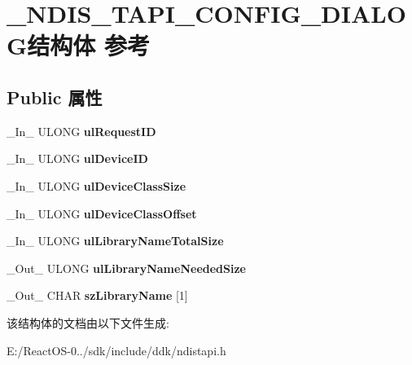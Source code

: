 \hypertarget{struct___n_d_i_s___t_a_p_i___c_o_n_f_i_g___d_i_a_l_o_g}{}\section{\+\_\+\+N\+D\+I\+S\+\_\+\+T\+A\+P\+I\+\_\+\+C\+O\+N\+F\+I\+G\+\_\+\+D\+I\+A\+L\+O\+G结构体 参考}
\label{struct___n_d_i_s___t_a_p_i___c_o_n_f_i_g___d_i_a_l_o_g}
\subsection*{Public 属性}
\begin{DoxyCompactItemize}
\item 
\mbox{\label{struct___n_d_i_s___t_a_p_i___c_o_n_f_i_g___d_i_a_l_o_g_a0784f47736613715735cf8b774d02174}} 
\+\_\+\+In\+\_\+ U\+L\+O\+NG {\bfseries ul\+Request\+ID}
\item 
\mbox{\label{struct___n_d_i_s___t_a_p_i___c_o_n_f_i_g___d_i_a_l_o_g_a23b6f6d15f03a883e38a49337dfbb064}} 
\+\_\+\+In\+\_\+ U\+L\+O\+NG {\bfseries ul\+Device\+ID}
\item 
\mbox{\label{struct___n_d_i_s___t_a_p_i___c_o_n_f_i_g___d_i_a_l_o_g_aa55d7a1994326e18fbecbd8649f31bcd}} 
\+\_\+\+In\+\_\+ U\+L\+O\+NG {\bfseries ul\+Device\+Class\+Size}
\item 
\mbox{\label{struct___n_d_i_s___t_a_p_i___c_o_n_f_i_g___d_i_a_l_o_g_a827738735acdee01dcc2b5cf349d06ac}} 
\+\_\+\+In\+\_\+ U\+L\+O\+NG {\bfseries ul\+Device\+Class\+Offset}
\item 
\mbox{\label{struct___n_d_i_s___t_a_p_i___c_o_n_f_i_g___d_i_a_l_o_g_a7301b428f702f6d2b85fda9676e68134}} 
\+\_\+\+In\+\_\+ U\+L\+O\+NG {\bfseries ul\+Library\+Name\+Total\+Size}
\item 
\mbox{\label{struct___n_d_i_s___t_a_p_i___c_o_n_f_i_g___d_i_a_l_o_g_aedb2b11aa2789f684c41c07d6224a6b4}} 
\+\_\+\+Out\+\_\+ U\+L\+O\+NG {\bfseries ul\+Library\+Name\+Needed\+Size}
\item 
\mbox{\label{struct___n_d_i_s___t_a_p_i___c_o_n_f_i_g___d_i_a_l_o_g_a48183d336a555f1e4a822e29c2200e65}} 
\+\_\+\+Out\+\_\+ C\+H\+AR {\bfseries sz\+Library\+Name} \mbox{[}1\mbox{]}
\end{DoxyCompactItemize}


该结构体的文档由以下文件生成\+:\begin{DoxyCompactItemize}
\item 
E\+:/\+React\+O\+S-\/0../sdk/include/ddk/ndistapi.\+h\end{DoxyCompactItemize}
